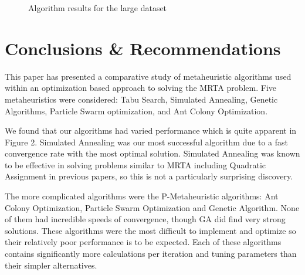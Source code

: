 \documentclass[a4paper]{article}
\begin{document}
\begin{center}
\begin{figure}
\noindent{}
\caption{Algorithm results for the large dataset}
\end{figure}
\end{center}

\newpage
\section{Conclusions \& Recommendations}

This paper has presented a comparative study of metaheuristic algorithms used within an optimization based approach to solving the MRTA problem. Five metaheuristics were considered: Tabu Search, Simulated Annealing, Genetic Algorithms, Particle Swarm optimization, and Ant Colony Optimization.

We found that our algorithms had varied performance which is quite apparent in Figure 2. Simulated Annealing was our most successful algorithm due to a fast convergence rate with the most optimal solution. Simulated Annealing was known to be effective in solving problems similar to MRTA including Quadratic Assignment in previous papers\cite{Badreldin}, so this is not a particularly surprising discovery.

The more complicated algorithms were the P-Metaheuristic algorithms: Ant Colony Optimization, Particle Swarm Optimization and Genetic Algorithm. None of them had incredible speeds of convergence, though GA did find very strong solutions. These algorithms were the most difficult to implement and optimize so their relatively poor performance is to be expected. Each of these algorithms contains significantly more calculations per iteration and tuning parameters than their simpler alternatives.
\end{document}
